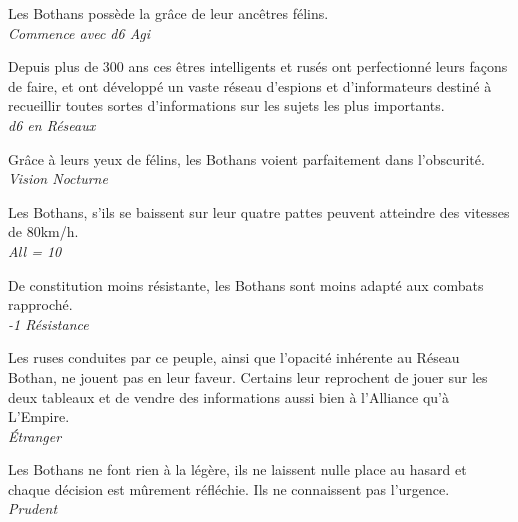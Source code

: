 \begin{description}[align=left]
\item [Agilité du Félin] 			%
		Les Bothans possède la grâce de leur ancêtres félins.\\
		\textit{Commence avec d6 Agi}

\item [Service de renseignement] 	%
		Depuis plus de 300 ans ces êtres intelligents et rusés ont perfectionné leurs façons de faire, et ont développé un vaste réseau d’espions et d’informateurs destiné à recueillir toutes sortes d’informations sur les sujets les plus importants.\\
		\textit{d6 en Réseaux}

\item [Comme en plein jour] 		%
		Grâce à leurs yeux de félins, les Bothans voient parfaitement dans l’obscurité.\\
		\textit{Vision Nocturne}

\item [Déplacement rapide] 			%
		Les Bothans, s’ils se baissent sur leur quatre pattes peuvent atteindre des vitesses de 80km/h.\\
		\textit{All = 10}

\item [Frêle] 						%
		De constitution moins résistante, les Bothans sont moins adapté aux combats rapproché.\\
		\textit{-1 Résistance}

\item [Mauvaise réputation] 		%
		Les ruses conduites par ce peuple, ainsi que l’opacité inhérente au Réseau Bothan, ne jouent pas en leur faveur. Certains leur reprochent de jouer sur les deux tableaux et de vendre des informations aussi bien à l’Alliance qu’à L’Empire.\\
		\textit{\'Etranger}

\item [Prudent] 					%
		Les Bothans ne font rien à la légère, ils ne laissent nulle place au hasard et chaque décision est mûrement réfléchie. Ils ne connaissent pas l’urgence.\\
		\textit{Prudent}
\end{description}
